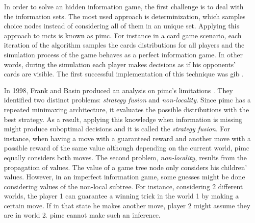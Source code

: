 In order to solve an hidden information game, the first challenge is to deal with the information sets.
The most used approach is determinization, which samples choice nodes instead of considering all of them in an unique set.
Applying this approach to \gls{mcts} is known as \gls{pimc}.
For instance in a card game scenario, each iteration of the algorithm samples the cards distributions for all players and the simulation process of the game behaves as a perfect information game.
In other words, during the simulation each player makes decisions as if his opponents' cards are visible.
The first successful implementation of this technique was \gls{gib} \cite{Ginsberg2001}.


In 1998, Frank and Basin produced an analysis on \gls{pimc}'s limitations \cite{Frank1998}.
They identified two distinct problems: \emph{strategy fusion} and \emph{non-locality}.
Since \gls{pimc} has a repeated minimaxing architecture, it evaluates the possible distributions with the best strategy.
As a result, applying this knowledge when information is missing might produce suboptimal decisions and it is called the \emph{strategy fusion}.
For instance, when having a move with a guaranteed reward and another move with a possible reward of the same value although depending on the current world, \gls{pimc} equally considers both moves.
The second problem, \emph{non-locality}, results from the propagation of values.
The value of a game tree node only considers his children' values.
However, in an imperfect information game, some guesses might be done considering values of the non-local subtree.
For instance, considering 2 different worlds, the player 1 can guarantee a winning trick in the world 1 by making a certain move.
If in that state he makes another move, player 2 might assume they are in world 2.
\gls{pimc} cannot make such an inference.



